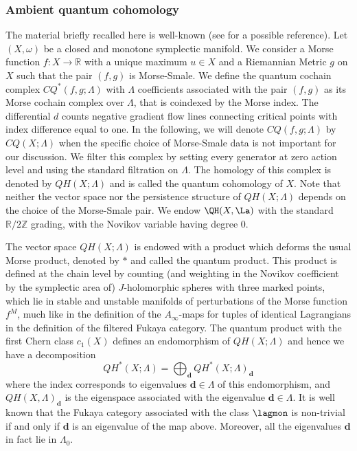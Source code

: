 \subsubsection{Ambient quantum cohomology}\label{AQH} The material briefly recalled here is well-known
(see \cite{she:fanofuk} for a possible reference). 
Let $(X,\omega)$ be a closed and monotone symplectic manifold. We consider a Morse function $f\colon X\to \mathbb{R}$ with a unique maximum $u\in X$ and a Riemannian Metric $g$ on $X$ such that the pair $(f,g)$ is Morse-Smale.  We define the quantum cochain complex $CQ^*(f,g;\Lambda)$ with $\Lambda$ coefficients associated with the pair $(f,g)$ as its Morse cochain complex over $\Lambda$, that is coindexed by the Morse index. The differential $d$ counts negative gradient flow lines connecting critical points with index difference equal to one. In the following, we
will denote $CQ(f , g ; \Lambda)$ by $CQ(X; \Lambda)$ when the specific choice of Morse-Smale data is not important for our discussion. We filter this complex by setting every generator at zero action level and using the standard filtration on $\Lambda$. The homology of this complex is denoted by $QH(X;\Lambda)$ and  is called the quantum cohomology of $X$. Note that neither the vector space nor the persistence structure of $QH(X;\Lambda)$ depends on the choice of the Morse-Smale pair. We endow $\QH(X,\La)$ with the standard $\mathbb{R}/2\mathbb{Z}$ grading, with the Novikov variable having degree $0$.

The vector space $QH(X;\Lambda)$ is endowed with a product which deforms the usual Morse product, denoted by $*$ and called the quantum product. This product is defined at the chain level by counting (and weighting in the Novikov coefficient by the symplectic area of) $J$-holomorphic spheres with three marked points, which  lie in stable and unstable manifolds of perturbations of the Morse function $f^M$, much like in the definition of the $A_\infty$-maps for tuples of identical Lagrangians in the definition of the filtered Fukaya category. The quantum product with the first Chern class $c_1(X)$ defines an endomorphism of $QH(X;\Lambda)$ and hence we have a decomposition $$QH^*(X;\Lambda) = \bigoplus_{\mathbf{d}} QH^*(X;\Lambda)_\mathbf{d}$$ where the index corresponds to eigenvalues $\mathbf{d}\in \Lambda$ of this endomorphism, and $QH(X,\Lambda)_\mathbf{d}$ is the eigenspace associated with the eigenvalue $\mathbf{d}\in \Lambda$. It is well known that the Fukaya category associated with the class $\lagmon$ is non-trivial if and only if $\mathbf{d}$ is an eigenvalue of the map above. Moreover, all the eigenvalues $\mathbf{d}$ in fact lie in $\Lambda_0$.

